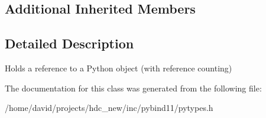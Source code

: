\subsection*{Additional Inherited Members}


\subsection{Detailed Description}
Holds a reference to a Python object (with reference counting) 

The documentation for this class was generated from the following file\+:\begin{DoxyCompactItemize}
\item 
/home/david/projects/hdc\+\_\+new/inc/pybind11/pytypes.\+h\end{DoxyCompactItemize}
